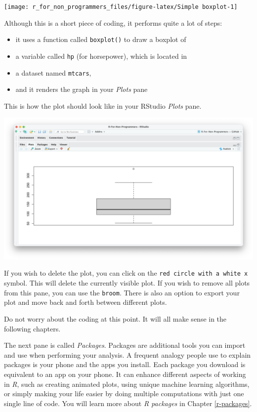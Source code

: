 \documentclass[
]{book}
\begin{document}
\begin{center}\texttt{[image: r\_for\_non\_programmers\_files/figure-latex/Simple boxplot-1]} \end{center}

Although this is a short piece of coding, it performs quite a lot of steps:

\begin{itemize}
\item
  it uses a function called \texttt{boxplot()} to draw a boxplot of
\item
  a variable called \texttt{hp} (for horsepower), which is located in
\item
  a dataset named \texttt{mtcars},
\item
  and it renders the graph in your \emph{Plots} pane
\end{itemize}

This is how the plot should look like in your RStudio \emph{Plots} pane.

\includegraphics{images/chapter_04_img/05_files_plots_etc/02_rstudio_plots.png}

If you wish to delete the plot, you can click on the \texttt{red\ circle\ with\ a\ white\ x} symbol. This will delete the currently visible plot. If you wish to remove all plots from this pane, you can use the \texttt{broom}. There is also an option to export your plot and move back and forth between different plots.

Do not worry about the coding at this point. It will all make sense in the following chapters.

The next pane is called \emph{Packages}. Packages are additional tools you can import and use when performing your analysis. A frequent analogy people use to explain packages is your phone and the apps you install. Each package you download is equivalent to an app on your phone. It can enhance different aspects of working in \emph{R}, such as creating animated plots, using unique machine learning algorithms, or simply making your life easier by doing multiple computations with just one single line of code. You will learn more about \emph{R packages} in Chapter \ref{r-packages}.
\end{document}
